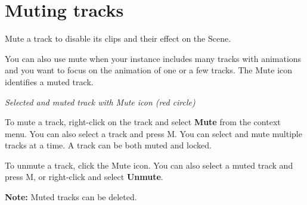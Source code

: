 \chapter{Muting tracks}
\hypertarget{md__hey_tea_9_2_library_2_package_cache_2com_8unity_8timeline_0d1_87_85_2_documentation_0i_2trk__mute}{}\label{md__hey_tea_9_2_library_2_package_cache_2com_8unity_8timeline_0d1_87_85_2_documentation_0i_2trk__mute}
\label{md__hey_tea_9_2_library_2_package_cache_2com_8unity_8timeline_0d1_87_85_2_documentation_0i_2trk__mute_autotoc_md4761}%
%
 Mute a track to disable its clips and their effect on the Scene.

You can also use mute when your  instance includes many tracks with animations and you want to focus on the animation of one or a few tracks. The Mute icon identifies a muted track.



{\itshape Selected and muted track with Mute icon (red circle)}

To mute a track, right-\/click on the track and select {\bfseries{Mute}} from the context menu. You can also select a track and press M. You can select and mute multiple tracks at a time. A track can be both muted and locked.

To unmute a track, click the Mute icon. You can also select a muted track and press M, or right-\/click and select {\bfseries{Unmute}}.

{\bfseries{Note\+:}} Muted tracks can be deleted. 